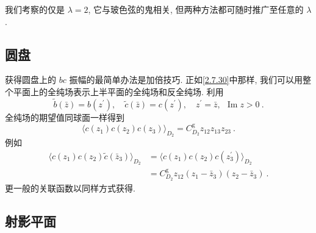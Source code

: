 我们考察的仅是 $\lambda=2$, 它与玻色弦的鬼相关, 但两种方法都可随时推广至任意的 $\lambda$.

\subsection*{圆盘}
获得圆盘上的 $bc$ 振幅的最简单办法是加倍技巧. 正如\eqref{2.7.30}中那样, 我们可以用整个平面上的全纯场表示上半平面的全纯场和反全纯场. 利用
\begin{equation}
	\tilde{b}(\bar{z})=b(z^{\prime}), \quad \tilde{c}(\bar{z})=c(z^{\prime}), \quad z^{\prime}=\bar{z},\:\: \operatorname{Im} z>0 \:.
	\label{6.3.9}
\end{equation}
全纯场的期望值同球面一样得到
\begin{equation}
	\langle c(z_{1}) c(z_{2}) c(z_{3})\rangle_{D_{2}}=C_{D_{2}}^{\mathrm{g}} z_{12} z_{13} z_{23} \:. \label{6.3.10}
\end{equation}
例如
\begin{align}
	\langle c(z_{1}) c(z_{2}) \tilde{c}(\bar{z}_{3})\rangle_{D_{2}} 
	&=\langle c(z_{1}) c(z_{2}) c(z_{3}^{\prime})\rangle_{D_{2}} \nonumber \\
	&=C_{D_{2}}^{\mathrm{g}} z_{12}(z_{1}-\bar{z}_{3})(z_{2}-\bar{z}_{3}) \:. \label{6.3.11}
\end{align}
更一般的关联函数以同样方式获得.

\subsection*{射影平面}

